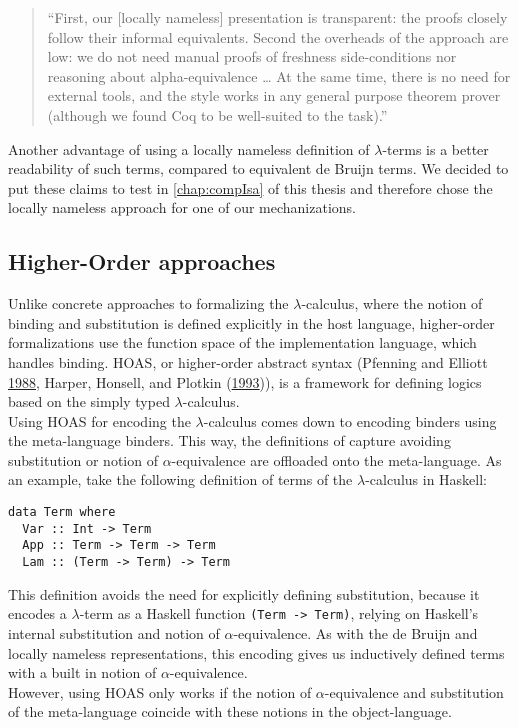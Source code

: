 \documentclass[a4paper, 12pt, twoside]{style/ociamthesis}
\theoremstyle{plain}
\theoremstyle{definition}
\theoremstyle{remark}
\begin{document}
\begin{quote}
``First, our {[}locally nameless{]} presentation is transparent: the
proofs closely follow their informal equivalents. Second the overheads
of the approach are low: we do not need manual proofs of freshness
side-conditions nor reasoning about alpha-equivalence \ldots{} At the
same time, there is no need for external tools, and the style works in
any general purpose theorem prover (although we found Coq to be
well-suited to the task).''
\end{quote}

Another advantage of using a locally nameless definition of
\(\lambda\)-terms is a better readability of such terms, compared to
equivalent de Bruijn terms. We decided to put these claims to test in
\cref{chap:compIsa} of this thesis and therefore chose the locally
nameless approach for one of our mechanizations.

\subsection{Higher-Order approaches}\label{higher-order-approaches}

Unlike concrete approaches to formalizing the \(\lambda\)-calculus,
where the notion of binding and substitution is defined explicitly in
the host language, higher-order formalizations use the function space of
the implementation language, which handles binding. HOAS, or
higher-order abstract syntax (Pfenning and Elliott
\protect\hyperlink{ref-pfenning88}{1988}, Harper, Honsell, and Plotkin
(\protect\hyperlink{ref-harper93}{1993})), is a framework for defining
logics based on the simply typed \(\lambda\)-calculus.\\
Using HOAS for encoding the \(\lambda\)-calculus comes down to encoding
binders using the meta-language binders. This way, the definitions of
capture avoiding substitution or notion of \(\alpha\)-equivalence are
offloaded onto the meta-language. As an example, take the following
definition of terms of the \(\lambda\)-calculus in Haskell:

\begin{verbatim}
data Term where
  Var :: Int -> Term
  App :: Term -> Term -> Term
  Lam :: (Term -> Term) -> Term
\end{verbatim}

This definition avoids the need for explicitly defining substitution,
because it encodes a \(\lambda\)-term as a Haskell function
\texttt{(Term -> Term)}, relying on Haskell's internal substitution and
notion of \(\alpha\)-equivalence. As with the de Bruijn and locally
nameless representations, this encoding gives us inductively defined
terms with a built in notion of \(\alpha\)-equivalence.\\
However, using HOAS only works if the notion of \(\alpha\)-equivalence
and substitution of the meta-language coincide with these notions in the
object-language.
\end{document}
